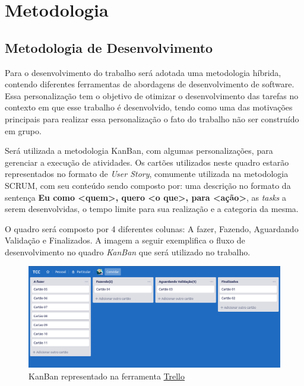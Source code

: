 \chapter[Metodologia]{Metodologia}

\section{Metodologia de Desenvolvimento}

Para o desenvolvimento do trabalho será adotada uma metodologia híbrida, contendo diferentes ferramentas de abordagens de desenvolvimento de software. Essa personalização tem o objetivo de otimizar o desenvolvimento das tarefas no contexto em que esse trabalho é desenvolvido, tendo como uma das motivações principais para realizar essa personalização o fato do trabalho não ser construído em grupo.

Será utilizada a metodologia KanBan, com algumas personalizações, para gerenciar a execução de atividades. Os cartões utilizados neste quadro estarão representados no formato de \textit{User Story}, comumente utilizada na metodologia SCRUM, com seu conteúdo sendo composto por: uma descrição no formato da sentença \textbf{Eu como <quem>, quero <o que>, para <ação>}, as \textit{tasks} a serem desenvolvidas, o tempo limite para sua realização e a categoria da mesma.

O quadro será composto por 4 diferentes colunas: A fazer, Fazendo, Aguardando Validação e Finalizados. A imagem a seguir exemplifica o fluxo de desenvolvimento no quadro \textit{KanBan} que será utilizado no trabalho.

    \begin{figure}[H]
         \centering
         \includegraphics[scale=0.4]{figuras/capitulo_4/kanban_exemplo.png}
         \caption{KanBan representado na ferramenta \href{https://trello.com/}{Trello}}
         \label{fig:kanban_trello_exe}
    \end{figure}

